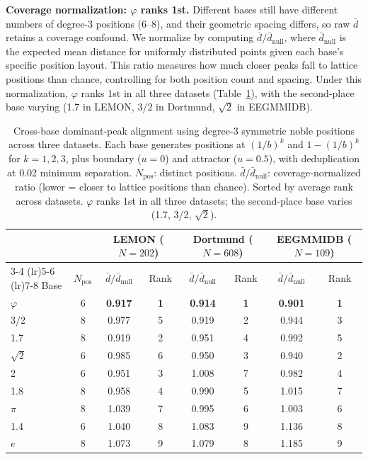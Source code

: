 \documentclass[11pt,a4paper]{article}
\newcommand{\phisym}{\varphi}
\begin{document}
\textbf{Coverage normalization: $\phisym$ ranks 1st.} Different bases still have different numbers of degree-3 positions (6--8), and their geometric spacing differs, so raw $\bar{d}$ retains a coverage confound. We normalize by computing $\bar{d}/\bar{d}_{\text{null}}$, where $\bar{d}_{\text{null}}$ is the expected mean distance for uniformly distributed points given each base's specific position layout. This ratio measures how much closer peaks fall to lattice positions than chance, controlling for both position count and spacing. Under this normalization, $\phisym$ ranks 1st in all three datasets (Table~\ref{tab:crossbase}), with the second-place base varying (1.7 in LEMON, 3/2 in Dortmund, $\sqrt{2}$ in EEGMMIDB).

\begin{table}[H]
\centering
\caption{Cross-base dominant-peak alignment using degree-3 symmetric noble positions across three datasets. Each base generates positions at $(1/b)^k$ and $1 - (1/b)^k$ for $k = 1, 2, 3$, plus boundary ($u = 0$) and attractor ($u = 0.5$), with deduplication at 0.02 minimum separation. $N_{\text{pos}}$: distinct positions. $\bar{d}/\bar{d}_{\text{null}}$: coverage-normalized ratio (lower = closer to lattice positions than chance). Sorted by average rank across datasets. $\phisym$ ranks 1st in all three datasets; the second-place base varies (1.7, 3/2, $\sqrt{2}$).}
\label{tab:crossbase}
\begin{tabular}{lccccccc}
\toprule
& & \multicolumn{2}{c}{LEMON ($N = 202$)} & \multicolumn{2}{c}{Dortmund ($N = 608$)} & \multicolumn{2}{c}{EEGMMIDB ($N = 109$)} \\
\cmidrule(lr){3-4} \cmidrule(lr){5-6} \cmidrule(lr){7-8}
Base & $N_{\text{pos}}$ & $\bar{d}/\bar{d}_{\text{null}}$ & Rank & $\bar{d}/\bar{d}_{\text{null}}$ & Rank & $\bar{d}/\bar{d}_{\text{null}}$ & Rank \\
\midrule
$\phisym$ & 6 & \textbf{0.917} & \textbf{1} & \textbf{0.914} & \textbf{1} & \textbf{0.901} & \textbf{1} \\
3/2 & 8 & 0.977 & 5 & 0.919 & 2 & 0.944 & 3 \\
1.7 & 8 & 0.919 & 2 & 0.951 & 4 & 0.992 & 5 \\
$\sqrt{2}$ & 6 & 0.985 & 6 & 0.950 & 3 & 0.940 & 2 \\
2 & 6 & 0.951 & 3 & 1.008 & 7 & 0.982 & 4 \\
1.8 & 8 & 0.958 & 4 & 0.990 & 5 & 1.015 & 7 \\
$\pi$ & 8 & 1.039 & 7 & 0.995 & 6 & 1.003 & 6 \\
1.4 & 6 & 1.040 & 8 & 1.083 & 9 & 1.136 & 8 \\
$e$ & 8 & 1.073 & 9 & 1.079 & 8 & 1.185 & 9 \\
\bottomrule
\end{tabular}
\end{table}
\end{document}
